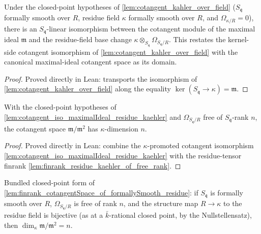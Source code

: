 \begin{lemma}
  \label{lem:cotangent_iso_maximalIdeal_residue_kaehler}
  Under the closed-point hypotheses of \cref{lem:cotangent_kahler_over_field}
  (\(S_{\mathfrak q}\) formally smooth over \(R\), residue field \(\kappa\) formally
  smooth over \(R\), and \(\Omega_{\kappa/R} = 0\)), there is an
  \(S_{\mathfrak q}\)-linear isomorphism between the cotangent module of the maximal
  ideal \(\mathfrak m\) and the residue-field base change
  \(\kappa \otimes_{S_{\mathfrak q}} \Omega_{S_{\mathfrak q}/R}\). This restates the
  kernel-side cotangent isomorphism of \cref{lem:cotangent_kahler_over_field} with the
  canonical maximal-ideal cotangent space as its domain.
\end{lemma}

\begin{proof}
  Proved directly in Lean: transports the isomorphism of
  \cref{lem:cotangent_kahler_over_field} along the equality
  \(\ker(S_{\mathfrak q} \to \kappa) = \mathfrak m\).
\end{proof}

\begin{lemma}
  \label{lem:finrank_cotangentSpace_of_formallySmooth_residue}
  With the closed-point hypotheses of
  \cref{lem:cotangent_iso_maximalIdeal_residue_kaehler} and
  \(\Omega_{S_{\mathfrak q}/R}\) free of \(S_{\mathfrak q}\)-rank \(n\), the cotangent
  space \(\mathfrak m / \mathfrak m^2\) has \(\kappa\)-dimension \(n\).
\end{lemma}

\begin{proof}
  Proved directly in Lean: combine the \(\kappa\)-promoted cotangent isomorphism
  \cref{lem:cotangent_iso_maximalIdeal_residue_kaehler} with the residue-tensor
  finrank \cref{lem:finrank_residue_kaehler_of_free_rank}.
\end{proof}

\begin{lemma}
  \label{lem:finrank_cotangentSpace_of_bijective_residue}
  Bundled closed-point form of
  \cref{lem:finrank_cotangentSpace_of_formallySmooth_residue}: if \(S_{\mathfrak q}\)
  is formally smooth over \(R\), \(\Omega_{S_{\mathfrak q}/R}\) is free of rank \(n\),
  and the structure map \(R \to \kappa\) to the residue field is bijective (as at a
  \(\bar k\)-rational closed point, by the Nullstellensatz), then
  \(\dim_\kappa \mathfrak m/\mathfrak m^2 = n\).
\end{lemma}

